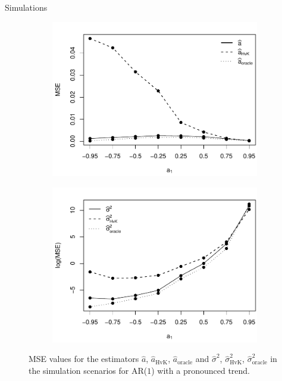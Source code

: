 \documentclass[10pt]{beamer}
\begin{document}
\begin{frame}{Simulations}

\begin{figure}[t!]
\begin{subfigure}[b]{0.475\textwidth}
\includegraphics[width=\textwidth]{MSE_a1_T=500_slope=10_(q,r,M1,M2)=(25,10,20,30).pdf}
\end{subfigure}\hspace{0.25cm}
\begin{subfigure}[b]{0.475\textwidth}
\includegraphics[width=\textwidth]{MSE_lrv_T=500_slope=10_(q,r,M1,M2)=(25,10,20,30).pdf}
\end{subfigure}
\caption{MSE values for the estimators $\widehat{a}$, $\widehat{a}_{\text{HvK}}$, $\widehat{a}_{\text{oracle}}$ and $\widehat{\sigma}^2$, $\widehat{\sigma}^2_{\text{HvK}}$, $\widehat{\sigma}^2_{\text{oracle}}$ in the simulation scenarios for AR($1$) with a pronounced trend.%
}\label{fig:MSE_slope10}
\end{figure}
\end{frame}
\end{document}
